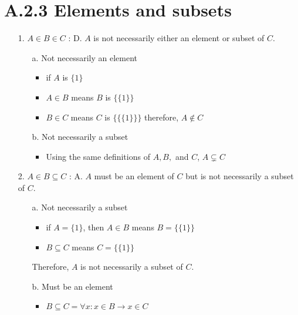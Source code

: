 \documentclass[12pt]{article}
\begin{document}
\section*{A.2.3 Elements and subsets}
\begin{enumerate}
  \item[1.] ${A \in B \in C}$ : D. ${A}$ is not necessarily either an element or subset of ${C}$.
    \begin{enumerate}
      \item[a.] Not necessarily an element
        \begin{itemize}
          \item if ${A}$ is ${\{1\}}$
          \item ${A \in B}$ means ${B}$ is ${\{\{1\}\}}$
          \item ${B \in C}$ means ${C}$ is ${\{\{\{1\}\}\}}$ therefore, ${A \notin C}$
        \end{itemize}
      \item[b.] Not necessarily a subset
        \begin{itemize}
          \item Using the same definitions of ${A, B,}$ and ${C}$, ${A \subsetneq C}$
        \end{itemize}
    \end{enumerate}
  \item[2.] ${A \in B \subseteq C}$ : A. ${A}$ must be an element of ${C}$ but is not necessarily a subset of ${C}$.
    \begin{enumerate}
      \item[a.] Not necessarily a subset
        \begin{itemize}
          \item if ${A = \{1\}}$, then ${A \in B}$ means ${B = \{\{1\}\}}$
          \item ${B \subseteq C}$ means ${C = \{\{1\}\}}$ 
        \end{itemize}

        Therefore, ${A}$ is not necessarily a subset of ${C}$.
      \item[b.] Must be an element
        \begin{itemize}
          \item ${B \subseteq C = \forall x: x \in B \rightarrow x \in C}$
        \end{itemize}
        

\end{enumerate}
\end{enumerate}
\end{document}
